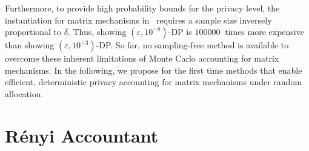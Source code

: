 \documentclass{article}
\theoremstyle{plain}
\theoremstyle{definition}
\theoremstyle{remark}
\renewcommand{\epsilon}{\varepsilon}
\begin{document}
Furthermore, to provide high probability bounds for the privacy level, the instantiation for matrix mechanisms in~\cite{choquette2024near} requires a sample size inversely proportional to $\delta$. Thus, showing $(\epsilon,10^{-8})$-DP is $\SI{100000}{}$ times more expensive than showing $(\epsilon,10^{-3})$-DP.
So far, no sampling-free method is available to overcome these inherent limitations of Monte Carlo accounting for matrix mechanisms. In the following, we propose for the first time methods that enable efficient, deterministic privacy accounting for matrix mechanisms under random allocation.


\section{Rényi Accountant}\label{section:rdp_accountant}
\end{document}
